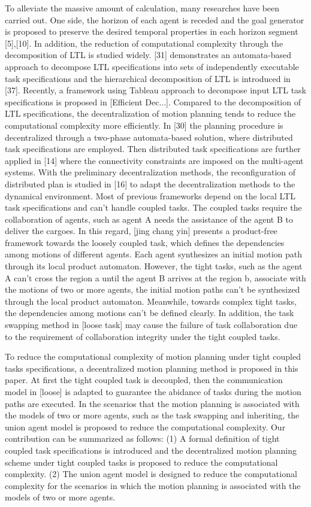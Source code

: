 \documentclass[journal]{IEEEtran}
\begin{document}
To alleviate the massive amount of calculation, many researches have been carried out. One side, the horizon of each agent is receded and the goal generator is proposed to preserve the desired temporal properties in each horizon segment [5],[10]. In addition, the reduction of computational complexity through the decomposition of LTL is studied widely. [31] demonstrates an automata-based approach to decompose LTL specifications into sets of independently executable task specifications and the hierarchical decomposition of LTL is introduced in [37]. Recently, a framework using Tableau approach to decompose input LTL task specifications is proposed in [Efficient Dec...]. Compared to the decomposition of LTL specifications, the decentralization of motion planning tends to reduce the computational complexity more efficiently. In [30] the planning procedure is decentralized through a two-phase automata-based solution, where distributed task specifications are employed. Then distributed task specifications are further applied in [14] where the connectivity constraints are imposed on the multi-agent systems. With the preliminary decentralization methods, the reconfiguration of distributed plan is studied in [16] to adapt the decentralization methods to the dynamical environment. Most of previous frameworks depend on the local LTL task specifications and can't handle coupled tasks. The coupled tasks require the collaboration of agents, such as agent A needs the assistance of the agent B to deliver the cargoes. In this regard, [jing chang yin] presents a product-free framework towards the loosely coupled task, which defines the dependencies among motions of different agents. Each agent synthesizes an initial motion path through its local product automaton. However, the tight tasks, such as the agent A can't cross the region a until the agent B arrives at the region b, associate with the motions of two or more agents, the initial motion paths can't be synthesized through the local product automaton. Meanwhile, towards complex tight tasks, the dependencies among motions can't be defined clearly. In addition, the task swapping method in [loose task] may cause the failure of task collaboration due to the requirement of collaboration integrity under the tight coupled tasks.

To reduce the computational complexity of motion planning under tight coupled tasks specifications, a decentralized motion planning method is proposed in this paper. At first the tight coupled task is decoupled, then the communication model in [loose] is adapted to guarantee the abidance of tasks during the motion paths are executed. In the scenarios that the motion planning is associated with the models of two or more agents, such as the task swapping and inheriting, the union agent model is proposed to reduce the computational complexity. Our contribution can be summarized as follows: (1) A formal definition of tight coupled task specifications is introduced and the decentralized motion planning scheme under tight coupled tasks is proposed to reduce the computational complexity. (2) The union agent model is designed to reduce the computational complexity for the scenarios in which the motion planning is associated with the models of two or more agents.
\end{document}
